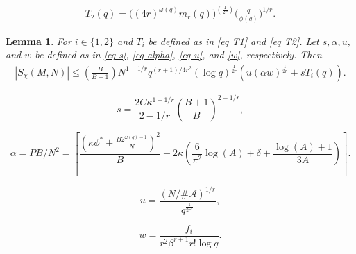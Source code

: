 \documentclass[10pt,a4paper]{amsart}
\newtheorem{lemma}{Lemma}
\newcommand{\cA}{{\mathcal{A}}}
\begin{document}
\begin{align}\label{eq T2}
    T_2(q) = \bigl((4r)^{\omega(q)} m_r(q)\bigr)^{\left({\frac{1}{2r}}\right)} \biggl( \frac q{\phi(q)} \biggr)^{1/r}.
\end{align}

\begin{lemma}\label{lemma to set up the main theorems}
For $i\in\{1, 2\}$ and $T_i$ be defined as in \eqref{eq T1} and \eqref{eq T2}. Let $s, \alpha, u, $ and $w$ be defined as in \eqref{eq s}, \eqref{eq alpha}, \eqref{eq u}, and \eqref{w}, respectively. Then
    \begin{equation*}
\begin{split}
    \left| S_\chi(M, N) \right|
    \le
    \left(\frac{B}{B-1}\right)N^{1-1/r}q^{(r+1)/{4r^2}}(\log q)^{\frac{1}{2r}}
    \left(
    u(\alpha w)^{\frac{1}{2r}}
    +sT_i(q)
    \right).
\end{split} 
\end{equation*}
\end{lemma}

\begin{equation}\label{eq s}
   s=\frac{2C\kappa^{1-1/r}}{2-1/r}\left(\frac{B+1}{B}\right)^{2-1/r},
\end{equation}

\begin{equation}\label{eq alpha}
    \alpha
    =
    PB/N^2
    =
    \left[ \frac{\left(\kappa\phi^*+\frac{B2^{\omega(q)-1}}{N} \right)^2}{B}
    +
    2\kappa\left(\frac{6}{\pi^2}\log{(A)}+\delta+\frac{\log{(A)}+1}{3A}\right)\right].
\end{equation}

\begin{equation}\label{eq u}
u=\frac{\left(N/\#\cA\right)^{1/{r}}}{q^{\frac{1}{2r^2}}},
\end{equation}

\begin{equation}
\label{w}
    w
    = \frac{f_i}{r^2 \beta^{r+1} r! \log{q}}.
\end{equation}
\end{document}
